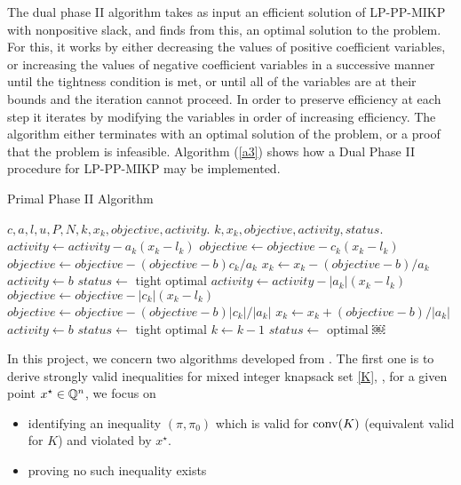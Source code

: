 \documentclass[a4paper,11pt]{article}
\begin{document}
The dual phase II algorithm takes as input an efficient solution of LP-PP-MIKP with nonpositive slack, and finds from this, an optimal solution to the problem. For this, it works by either decreasing the values of positive coefficient variables, or increasing the values of negative coefficient variables in a successive manner until the tightness condition is met, or until all of the variables are at their bounds and the iteration cannot proceed. In order to preserve efficiency at each step it iterates by modifying the variables in order of increasing efficiency. The algorithm either terminates with an optimal solution of the problem, or a proof that the problem is infeasible. Algorithm (\ref{a3}) shows how a Dual Phase II procedure for LP-PP-MIKP may be implemented.

\begin{algorithm}
\caption{Primal Phase II Algorithm}
\label{a3}
\begin{algorithmic}[1] 
\REQUIRE $c,a,l,u, P,N, k, x_k, objective, activity.$
\ENSURE $k, x_k, objective, activity, status.$
			\STATE $activity\leftarrow activity-a_k(x_k-l_k)$
			\STATE $objective\leftarrow objective-c_k(x_k-l_k)$
		\ELSE 
			\STATE $objective\leftarrow objective-(objective-b)c_k/a_k$
			\STATE $x_k\leftarrow x_k - (objective-b)/a_k$
			\STATE $activity\leftarrow b$
			\STATE $status\leftarrow$ tight optimal
			\RETURN
		\ENDIF
	\ELSE
			\STATE $activity\leftarrow activity-|a_k|(x_k-l_k)$
			\STATE $objective\leftarrow objective-|c_k|(x_k-l_k)$
		\ELSE 
			\STATE $objective\leftarrow objective-(objective-b)|c_k|/|a_k|$
			\STATE $x_k\leftarrow x_k + (objective-b)/|a_k|$
			\STATE $activity\leftarrow b$
			\STATE $status\leftarrow$ tight optimal
			\RETURN
		\ENDIF		
	\ENDIF
	\STATE $k\leftarrow k-1$
\ENDWHILE
\STATE $status\leftarrow$ optimal
\RETURN
￼
\end{algorithmic} 
\end{algorithm}

\iffalse
In this project, we concern two algorithms developed from \cite{fukasawa2011exact}. The first one is to derive strongly valid inequalities for mixed integer knapsack set \eqref{K}, \ie, for a given 
point $x^\star\in \mathbb{Q}^n$, we focus on
\begin{itemize}
 \item identifying an inequality $(\pi,\pi_0)$ which is valid for $\operatorname{conv}(K)$ (equivalent valid for $K$) and violated by $x^\star$.
 \item proving no such inequality exists
\end{itemize}
\end{document}
